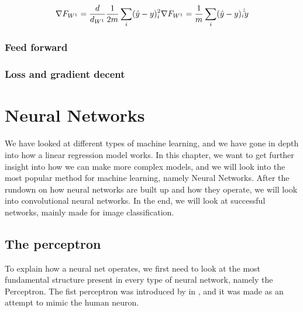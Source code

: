 \begin{equation}
     \nabla F_{W^1} = \frac{d}{d_{W^{1}} } \frac{1}{2m} \sum_i (\hat{y}-y)_i^2 \\
     \nabla F_{W^1} = \frac{1}{m} \sum_i (\hat{y}-y)_i \dot \hat{y}\\
\end{equation}

 
    
	
	
	
	\subsubsection{Feed forward}
    
	\subsubsection{Loss and gradient decent }


	

   
	  

	
\section{Neural Networks}
We have looked at different types of machine learning, and we have gone in depth into how a linear regression model works. In this chapter, we want to get further insight into how we can make more complex models, and we will look into the most popular method for machine learning, namely Neural Networks. 
After the rundown on how neural networks are built up and how they operate, we will look into convolutional neural networks. In the end, we will look at successful networks, mainly made for image classification.


\subsection{The perceptron}
To explain how a neural net operates, we first need to look at the most fundamental structure present in every type of neural network, namely the Perceptron.
The fist perceptron was introduced by  in , and it was made as an attempt to mimic the human neuron.  


